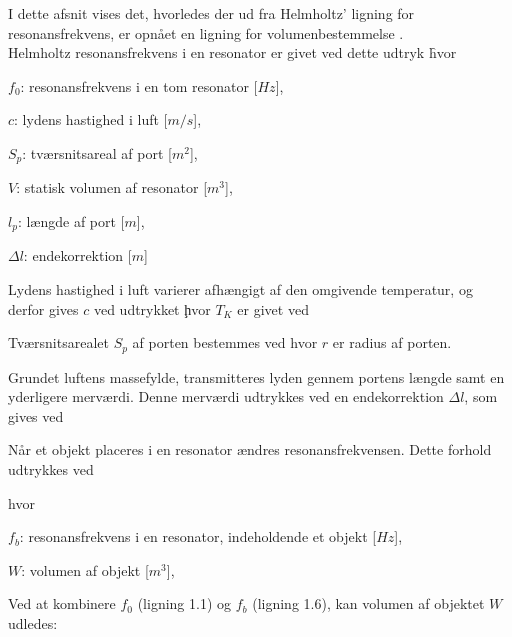 I dette afsnit vises det, hvorledes der ud fra Helmholtz' ligning for resonansfrekvens, er opnået en ligning for volumenbestemmelse \citep{RefWorks:22}. \\
 Helmholtz resonansfrekvens i en resonator er givet ved dette udtryk \f

hvor 
\begin{description}[align=left,labelindent=0.3cm]
\item $f_{0}$: resonansfrekvens i en tom resonator [$Hz$],\\
\item $c$: lydens hastighed i luft [$m/s$],\\
\item $S_{p}$: tværsnitsareal af port [$m^2$],\\
\item $V$: statisk volumen af resonator [$m^3$],\\
\item $l_{p}$: længde af port [$m$],\\
\item $\Delta l$: endekorrektion [$m$]\\
\end{description}

Lydens hastighed i luft varierer afhængigt af den omgivende temperatur, og derfor gives $c$ ved udtrykket \c 

hvor $T_{K}$ er givet ved \T

Tværsnitsarealet $S_{p}$ af porten bestemmes ved \Sp 
hvor ${r}$ er radius af porten. 

Grundet luftens massefylde, transmitteres lyden gennem portens længde samt en yderligere merværdi. Denne merværdi udtrykkes ved en endekorrektion $\Delta l$, som gives ved \deltal 

Når et objekt placeres i en resonator ændres resonansfrekvensen. Dette forhold udtrykkes ved \fb

hvor 
\begin{description}[align=left,labelindent=0.3cm]
\item $f_{b}$: resonansfrekvens i en resonator, indeholdende et objekt [$Hz$],\\
\item $W$: volumen af objekt [$m^3$],\\
\end{description}

Ved at kombinere $f_{0}$ (ligning 1.1) og $f_{b}$ (ligning 1.6), kan volumen af objektet $W$ udledes: 

